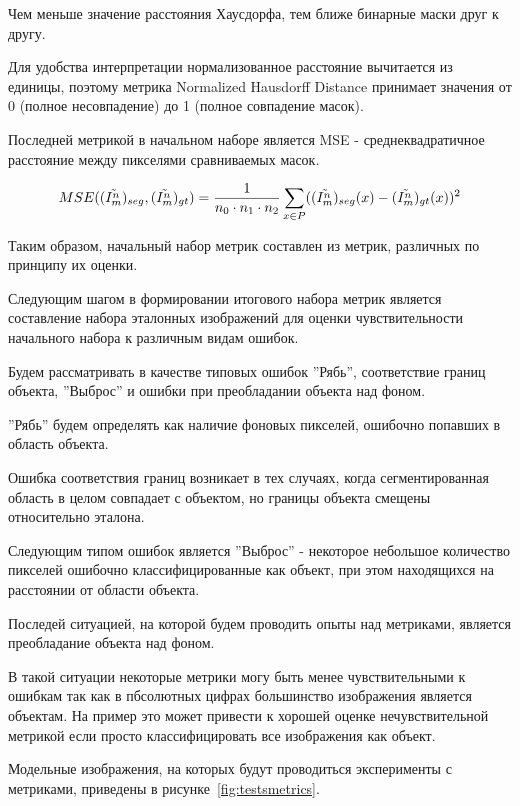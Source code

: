 Чем меньше значение расстояния Хаусдорфа, тем ближе бинарные маски друг к другу.

Для удобства интерпретации нормализованное расстояние вычитается из единицы, поэтому метрика Normalized Hausdorff Distance принимает значения от 0 (полное несовпадение) до 1 (полное совпадение масок).

Последней метрикой в начальном наборе является MSE - среднеквадратичное расстояние между пикселями сравниваемых масок.

\begin{equation}\label{eq:MSE}
    MSE((\tilde{I^n_m})_{seg}, (\tilde{I^n_m})_{gt}) = \frac{1}{n_0 \cdot n_1 \cdot n_2} \sum_{x \in P} ((\tilde{I^n_m})_{seg}(x) - (\tilde{I^n_m})_{gt}(x))^2
\end{equation}

Таким образом, начальный набор метрик составлен из метрик, различных по принципу их оценки.

Следующим шагом в формировании итогового набора метрик является составление набора эталонных изображений для оценки чувствительности начального набора к различным видам ошибок.

Будем рассматривать в качестве типовых ошибок ''Рябь'', соответствие границ объекта, ''Выброс'' и ошибки при преобладании объекта над фоном.

''Рябь'' будем определять как наличие фоновых пикселей, ошибочно попавших в область объекта.

Ошибка соответствия границ возникает в тех случаях, когда сегментированная область в целом совпадает с объектом, но границы объекта смещены относительно эталона. 

Следующим типом ошибок является ''Выброс'' - некоторое небольшое количество пикселей ошибочно классифицированные как объект, при этом находящихся на расстоянии от области объекта.

Последей ситуацией, на которой будем проводить опыты над метриками, является преобладание объекта над фоном. 

В такой ситуации некоторые метрики могу быть менее чувствительными к ошибкам так как в пбсолютных цифрах большинство изображения является объектам. На пример это может привести к хорошей оценке нечувствительной метрикой если просто классифицировать все изображения как объект.

Модельные изображения, на которых будут проводиться эксперименты с метриками, приведены в рисунке~\ref{fig:testsmetrics}.


